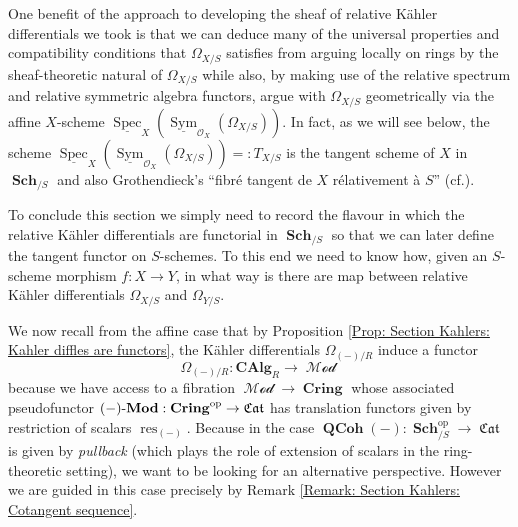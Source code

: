 \documentclass{amsart}
\theoremstyle{definition}
\DeclareMathOperator{\Ocal}{\mathcal{O}}
\DeclareMathOperator{\sym}{Sym}
\DeclareMathOperator{\Cring}{\mathbf{Cring}}
\DeclareMathOperator{\fCat}{\mathfrak{Cat}}
\DeclareMathOperator{\res}{res}
\DeclareMathOperator{\op}{op}
\DeclareMathOperator{\MMod}{\mathcal{Mod}}
\DeclareMathOperator{\Spec}{Spec}
\newcommand{\CAlg}[1]{\mathbf{CAlg}_{#1}}
\newcommand{\RelSpec}[1]{\underline{\Spec}_{#1}}
\newcommand{\RelSym}[1]{\underline{\sym}_{{#1}}}
\DeclareMathOperator{\Sch}{\mathbf{Sch}}
\DeclareMathOperator{\QCoh}{\mathbf{QCoh}}
\newcommand{\Mod}[1]{{#1}\textnormal{-}\mathbf{Mod}}
\newcommand{\Kah}[2]{\Omega_{{#1}/{#2}}}
\numberwithin{equation}{subsection}
\begin{document}
One benefit of the approach to developing the sheaf of relative K{\"a}hler differentials we took is that we can deduce many of the universal properties and compatibility conditions that $\Kah{X}{S}$ satisfies from arguing locally on rings by the sheaf-theoretic natural of $\Kah{X}{S}$ while also, by making use of the relative spectrum and relative symmetric algebra functors, argue with $\Kah{X}{S}$ geometrically via the affine $X$-scheme $\RelSpec{X}(\RelSym{\Ocal_X}(\Kah{X}{S}))$. In fact, as we will see below, the scheme $\RelSpec{X}(\RelSym{\Ocal_X}(\Kah{X}{S})) =: T_{X/S}$ is the tangent scheme of $X$ in $\Sch_{/S}$ and also Grothendieck's ``{fibr{\'e} tangent de $X$ r{\'e}lativement {\`a} $S$}'' (cf.\@ \cite[Section 16.5.12, Line 3]{EGA44}). 

To conclude this section we simply need to record the flavour in which the relative K{\"a}hler differentials are functorial in $\Sch_{/S}$ so that we can later define the tangent functor on $S$-schemes. To this end we need to know how, given an $S$-scheme morphism $f:X \to Y$, in what way is there are map between relative K{\"a}hler differentials $\Kah{X}{S}$ and $\Kah{Y}{S}$.

We now recall from the affine case that by Proposition \ref{Prop: Section Kahlers: Kahler diffles are functors}, the K{\"a}hler differentials $\Kah{(-)}{R}$ induce a functor
\[
\Kah{(-)}{R}:\CAlg{R} \to \MMod
\]
because we have access to a fibration $\MMod \to \Cring$ whose associated pseudofunctor $\Mod{(-)}:\Cring^{\op} \to \fCat$ has translation functors given by restriction of scalars $\res_{(-)}$. Because in the case $\QCoh(-):\Sch_{/S}^{\op} \to \fCat$ is given by \emph{pullback} (which plays the role of extension of scalars in the ring-theoretic setting), we want to be looking for an alternative perspective. However we are guided in this case precisely by Remark \ref{Remark: Section Kahlers: Cotangent sequence}. 
\end{document}
